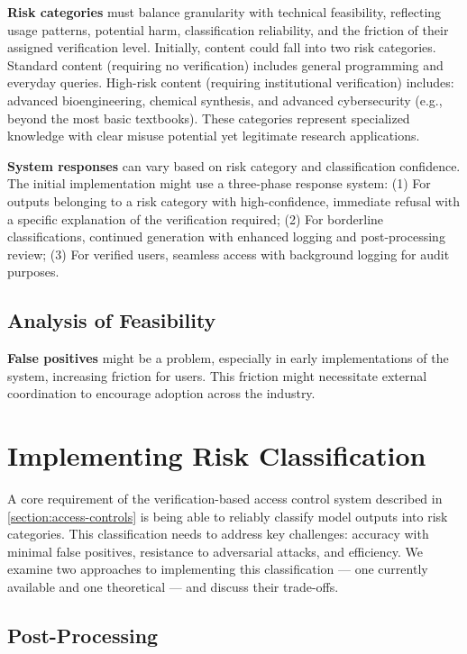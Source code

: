 \documentclass{article}
\theoremstyle{plain}
\theoremstyle{definition}
\theoremstyle{remark}
\begin{document}
\textbf{Risk categories} must balance granularity with technical
feasibility, reflecting usage patterns, potential harm,
classification reliability, and the friction of their assigned
verification level. Initially, content could fall into two risk
categories. Standard content (requiring no verification) includes
general programming and everyday queries. High-risk content
(requiring institutional verification) includes: advanced
bioengineering, chemical synthesis, and advanced cybersecurity (e.g.,
beyond the most basic textbooks). These categories represent
specialized knowledge with clear misuse potential yet legitimate
research applications.

\textbf{System responses} can vary based on risk category and
classification confidence.
The initial implementation might use a three-phase response system:
(1) For outputs belonging to a risk category with high-confidence,
immediate refusal with a specific explanation of the verification
required; (2) For borderline classifications, continued generation
with enhanced logging and post-processing review; (3) For verified
users, seamless access with background logging for audit purposes.

\subsection{Analysis of Feasibility}

\textbf{False positives} might be a problem, especially in early
implementations of the system, increasing friction for users. This
friction might necessitate external coordination to encourage
adoption across the industry.

\section{Implementing Risk Classification} \label{section:risk-classification}

A core requirement of the verification-based access control system
described in \cref{section:access-controls} is being able to reliably
classify model outputs into risk categories.
This classification needs to address key challenges: accuracy with
minimal false positives, resistance to adversarial attacks, and efficiency.
We examine two approaches to implementing this classification --- one
currently available and one theoretical --- and discuss their trade-offs.

\subsection{Post-Processing}
\end{document}
